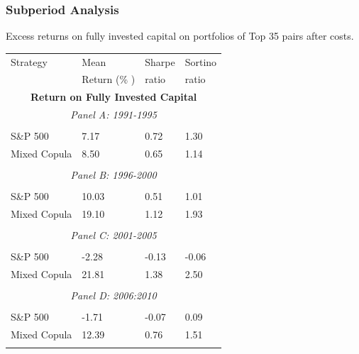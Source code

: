 \documentclass[pdf,10pt,xcolor=dvipsnames,hide notes]{beamer}
\begin{document}
\begin{frame}

\frametitle{Subperiod Analysis}

\begin{threeparttable}[H]
\centering \tiny
\caption{Excess returns on fully invested capital on portfolios of Top 35 pairs after costs. }
\begin{tabularx}{\textwidth}{@{\extracolsep{\fill}}llll@{}}
	\toprule
	Strategy & Mean  & Sharpe & Sortino \\
	& Return (\% ) & ratio &  ratio     \\
	\midrule
	\multicolumn{4}{c}{\textbf{Return on Fully Invested Capital}} \\
	\multicolumn{4}{c}{\textit{Panel A: 1991-1995}} \\
	&       &       &       \\
	S\&P 500 & 7.17  & 0.72  & 1.30 \\
	Mixed Copula & 8.50  & 0.65  & 1.14 \\
	\multicolumn{1}{r}{} & \multicolumn{1}{r}{} & \multicolumn{1}{r}{} & \multicolumn{1}{r}{} \\
	\multicolumn{4}{c}{\textit{Panel B: 1996-2000}} \\
	&       &       &       \\
	S\&P 500 & 10.03  & 0.51  & 1.01 \\
	Mixed Copula & 19.10  & 1.12  & 1.93 \\
	\multicolumn{1}{r}{} & \multicolumn{1}{r}{} & \multicolumn{1}{r}{} & \multicolumn{1}{r}{} \\
	\multicolumn{4}{c}{\textit{Panel C: 2001-2005}} \\
	&       &       &       \\
	S\&P 500 & -2.28  & \cellcolor{Melon} -0.13  & -0.06 \\
	Mixed Copula & 21.81  & \cellcolor{corn} 1.38  & 2.50 \\
	\multicolumn{1}{r}{} & \multicolumn{1}{r}{} & \multicolumn{1}{r}{} & \multicolumn{1}{r}{} \\
	\multicolumn{4}{c}{\textit{Panel D: 2006:2010}} \\
	&       &       &       \\
	S\&P 500 & -1.71  & \cellcolor{Melon} -0.07  & 0.09 \\
	Mixed Copula & 12.39  & \cellcolor{corn} 0.76  & 1.51 \\
	\multicolumn{1}{r}{} & \multicolumn{1}{r}{} & \multicolumn{1}{r}{} & \multicolumn{1}{r}{} \\

\end{tabularx}
\end{threeparttable}
\end{frame}
\end{document}
